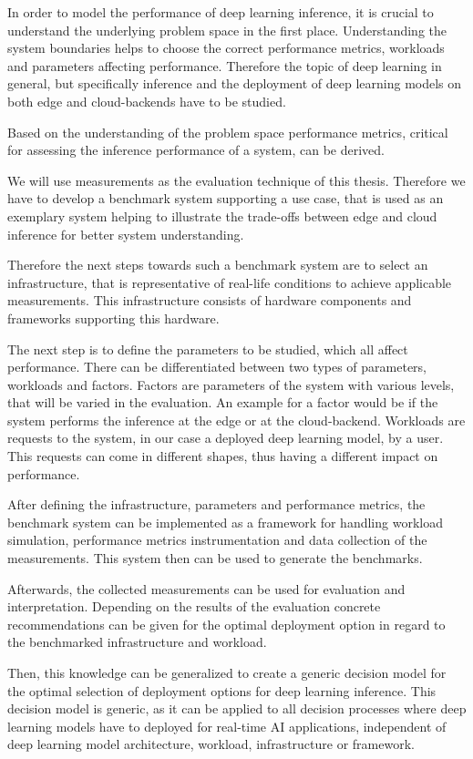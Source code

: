 In order to model the performance of deep learning inference, it is crucial to understand the underlying problem space in the first place.
Understanding the system boundaries helps to choose the correct performance metrics, workloads and parameters affecting performance.
Therefore the topic of deep learning in general, but specifically inference and the deployment of deep learning models on both edge and cloud-backends have to be studied.

Based on the understanding of the problem space performance metrics, critical for assessing the inference performance of a system, can be derived.

We will use measurements as the evaluation technique of this thesis. 
Therefore we have to develop a benchmark system supporting a use case, that is used as an exemplary system helping to illustrate the trade-offs between edge and cloud inference for better system understanding.

Therefore the next steps towards such a benchmark system are to select an infrastructure, that is representative of real-life conditions to achieve applicable measurements. 
This infrastructure consists of hardware components and frameworks supporting this hardware. 

The next step is to define the parameters to be studied, which all affect performance.
There can be differentiated between two types of parameters, workloads and factors.
Factors are parameters of the system with various levels, that will be varied in the evaluation. An example for a factor would be if the system performs the inference at the edge or at the cloud-backend.
Workloads are requests to the system, in our case a deployed deep learning model, by a user.
This requests can come in different shapes, thus having a different impact on performance.



After defining the infrastructure, parameters and performance metrics, the benchmark system can be implemented as a framework for handling workload simulation, performance metrics instrumentation and data collection of the measurements.
This system then can be used to generate the benchmarks. 

Afterwards, the collected measurements can be used for evaluation and interpretation.
Depending on the results of the evaluation concrete recommendations can be given for the optimal deployment option in regard to the benchmarked infrastructure and workload.

Then, this knowledge can be generalized to create a generic decision model for the optimal selection of deployment options for deep learning inference.
This decision model is generic, as it can be applied to all decision processes where deep learning models have to deployed for real-time AI applications, independent of deep learning model architecture, workload, infrastructure or framework.




